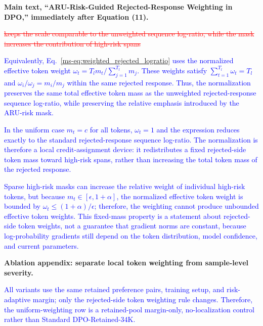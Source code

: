 \documentclass[12pt]{article}
\newcommand{\deleted}[1]{\textcolor{red}{\sout{#1}}}
\newcommand{\added}[1]{\textcolor{blue}{#1}}
\begin{document}
\textbf{Main text, ``ARU-Risk-Guided Rejected-Response Weighting in DPO,''
immediately after Equation (11).}

\begin{displayquote}
\deleted{keeps the scale comparable to the unweighted sequence log-ratio, while the mask increases the contribution of high-risk spans}

\added{Equivalently, Eq.~\ref*{ms-eq:weighted_rejected_logratio} uses the normalized effective token weight
$\omega_t=T_lm_t/\sum_{j=1}^{T_l}m_j$. These weights satisfy
$\sum_{t=1}^{T_l}\omega_t=T_l$ and $\omega_i/\omega_j=m_i/m_j$ within the same
rejected response. Thus, the normalization preserves the same total effective token
mass as the unweighted rejected-response sequence log-ratio, while preserving the
relative emphasis introduced by the ARU-risk mask.}

\added{In the uniform case $m_t=c$ for all tokens, $\omega_t=1$ and the expression
reduces exactly to the standard rejected-response sequence log-ratio. The
normalization is therefore a local credit-assignment device: it redistributes a fixed
rejected-side token mass toward high-risk spans, rather than increasing the total
token mass of the rejected response.}

\added{Sparse high-risk masks can increase the relative weight of individual
high-risk tokens, but because $m_t\in[\epsilon,1+\alpha]$, the normalized effective
token weight is bounded by $\omega_t\le (1+\alpha)/\epsilon$; therefore, the weighting
cannot produce unbounded effective token weights. This fixed-mass property is a
statement about rejected-side token weights, not a guarantee that gradient norms are
constant, because log-probability gradients still depend on the token distribution,
model confidence, and current parameters.}
\end{displayquote}

\textbf{Ablation appendix: separate local token weighting from sample-level
severity.}
\begin{displayquote}
\added{All variants use the same retained preference pairs, training setup, and risk-adaptive margin; only the rejected-side token weighting rule changes. Therefore, the uniform-weighting row is a retained-pool margin-only, no-localization control rather than Standard DPO-Retained-34K.}
\end{displayquote}
\end{document}

